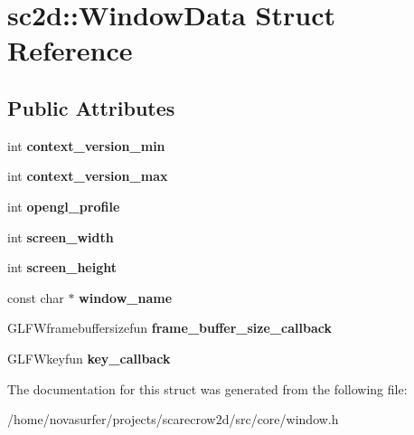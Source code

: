 \hypertarget{structsc2d_1_1WindowData}{}\section{sc2d\+:\+:Window\+Data Struct Reference}
\label{structsc2d_1_1WindowData}
\subsection*{Public Attributes}
\begin{DoxyCompactItemize}
\item 
\mbox{\label{structsc2d_1_1WindowData_a329927b97d37a7039b04a003444e099a}} 
int {\bfseries context\+\_\+version\+\_\+min}
\item 
\mbox{\label{structsc2d_1_1WindowData_a241f55fe0787d8bd9b879304e68c597c}} 
int {\bfseries context\+\_\+version\+\_\+max}
\item 
\mbox{\label{structsc2d_1_1WindowData_a725afa79d23cc1bcc1c9aaa56d11c5a4}} 
int {\bfseries opengl\+\_\+profile}
\item 
\mbox{\label{structsc2d_1_1WindowData_acd449e0527c50a1aa8856ce8a3d7b015}} 
int {\bfseries screen\+\_\+width}
\item 
\mbox{\label{structsc2d_1_1WindowData_a0eb4d71f46f60e04e4c8bfef06b61082}} 
int {\bfseries screen\+\_\+height}
\item 
\mbox{\label{structsc2d_1_1WindowData_ac590af28b89a6e785d9065125012dee2}} 
const char $\ast$ {\bfseries window\+\_\+name}
\item 
\mbox{\label{structsc2d_1_1WindowData_ae8e59cd551270fb8aa306f8a01db3c78}} 
G\+L\+F\+Wframebuffersizefun {\bfseries frame\+\_\+buffer\+\_\+size\+\_\+callback}
\item 
\mbox{\label{structsc2d_1_1WindowData_a503aa995fc885844bc4bca1c979c7990}} 
G\+L\+F\+Wkeyfun {\bfseries key\+\_\+callback}
\end{DoxyCompactItemize}


The documentation for this struct was generated from the following file\+:\begin{DoxyCompactItemize}
\item 
/home/novasurfer/projects/scarecrow2d/src/core/window.\+h\end{DoxyCompactItemize}
